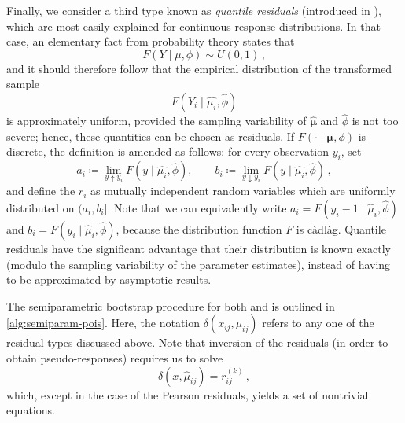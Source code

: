 \documentclass[a4paper]{book}
\begin{document}
Finally, we consider a third type known as \emph{quantile residuals} (introduced in \cite{dunn:rand-quant-res}), which are most easily explained for continuous response distributions. In that case, an elementary fact from probability theory states that
\begin{equation}
  F(Y \mid \mu, \phi) \sim U(0, 1) \,,
\end{equation}
and it should therefore follow that the empirical distribution of the transformed sample
\begin{equation}
  F(Y_i \mid \widehat{\mu_i}, \widehat{\phi})
\end{equation}
is approximately uniform, provided the sampling variability of $\bm{\widehat{\mu}}$ and $\widehat{\phi}$ is not too severe; hence, these quantities can be chosen as residuals. If $F(\cdot \mid \bm{\mu}, \phi)$ is discrete, the definition is amended as follows: for every observation $y_i$, set
\begin{equation}
  a_i \coloneqq \lim_{y \uparrow y_i} F(y \mid \widehat{\mu_i}, \widehat{\phi}), \qquad b_i \coloneqq \lim_{y \downarrow y_i} F(y \mid \widehat{\mu_i}, \widehat{\phi}) \,,
\end{equation}
and define the $r_i$ as mutually independent random variables which are uniformly distributed on $(a_i, b_i]$. Note that we can equivalently write $a_i = F(y_i - 1 \mid \widehat{\mu}_i, \widehat{\phi})$ and $b_i = F(y_i \mid \widehat{\mu}_i, \widehat{\phi})$, because the distribution function $F$ is c\`adl\`ag. Quantile residuals have the significant advantage that their distribution is known exactly (modulo the sampling variability of the parameter estimates), instead of having to be approximated by asymptotic results.

The semiparametric bootstrap procedure for both  and  is outlined in \cref{alg:semiparam-pois}. Here, the notation $\delta(x_{ij}, \mu_{ij})$ refers to any one of the residual types discussed above. Note that inversion of the residuals (in order to obtain pseudo-responses) requires us to solve
\begin{equation}
  \delta(x, \widehat{\mu}_{ij}) = r^{(k)}_{ij} \,,
\end{equation}
which, except in the case of the Pearson residuals, yields a set of nontrivial equations.
\end{document}
